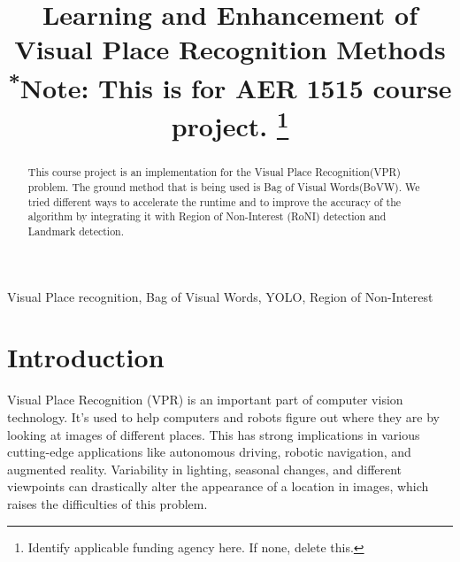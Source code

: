 \documentclass[conference]{IEEEtran}
\begin{document}
\title{Learning and Enhancement of Visual Place Recognition Methods\\
{\footnotesize \textsuperscript{*}Note: This is for AER 1515 course project.}
\thanks{Identify applicable funding agency here. If none, delete this.}
}

\author{
\and
{}
}

\maketitle

\begin{abstract}
This course project is an implementation for the Visual Place Recognition(VPR) problem. The ground method that is being used is Bag of Visual Words(BoVW). We tried different ways to accelerate the runtime and to improve the accuracy of the algorithm by integrating it with Region of Non-Interest (RoNI) detection and Landmark detection.\\
\end{abstract}

\begin{IEEEkeywords}
Visual Place recognition, Bag of Visual Words, YOLO, Region of Non-Interest
\end{IEEEkeywords}

\section{Introduction}

Visual Place Recognition (VPR) is an important part of computer vision technology. It's used to help computers and robots figure out where they are by looking at images of different places. This has strong implications in various cutting-edge applications like autonomous driving, robotic navigation, and augmented reality. Variability in lighting, seasonal changes, and different viewpoints can drastically alter the appearance of a location in images, which raises the difficulties of this problem.
\end{document}
